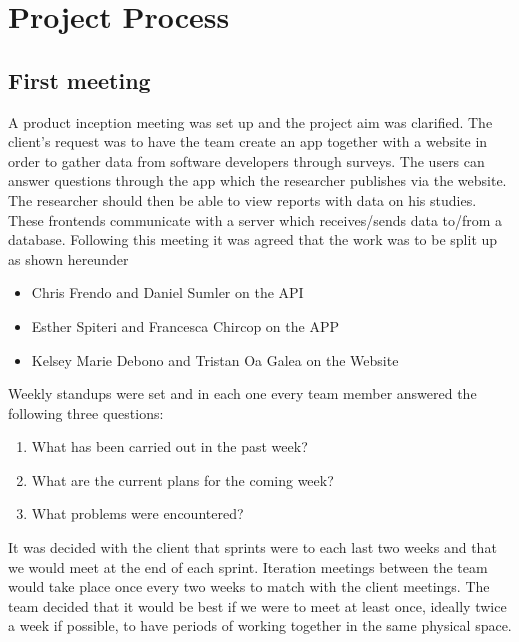 \documentclass[12pt, a4paper]{report}
\begin{document}
\chapter{Project Process}

\section{First meeting}
A product inception meeting was set up and the project aim was clarified. The client's request was to have the team create an app together with a website in order to gather data from software developers through surveys. The users can answer questions through the app which the researcher publishes via the website. The researcher should then be able to view reports with data on his studies. These frontends communicate with a server which receives/sends data to/from a database. Following this meeting it was agreed that the work was to be split up as shown hereunder
\begin{itemize}
\item Chris Frendo and Daniel Sumler on the API
\item Esther Spiteri and Francesca Chircop on the APP
\item Kelsey Marie Debono and Tristan Oa Galea on the Website
\end{itemize}
Weekly standups were set and in each one every team member answered the following three questions:
\begin{enumerate}
    \item What has been carried out in the past week? 
    \item What are the current plans for the coming week?
    \item What problems were encountered? 
\end{enumerate} 
It was decided with the client that sprints were to each last two weeks and that we would meet at the end of each sprint. Iteration meetings between the team would take place once every two weeks to match with the client meetings. The team decided that it would be best if we were to meet at least once, ideally twice a week if possible, to have periods of working together in the same physical space. 

\newpage
\end{document}
